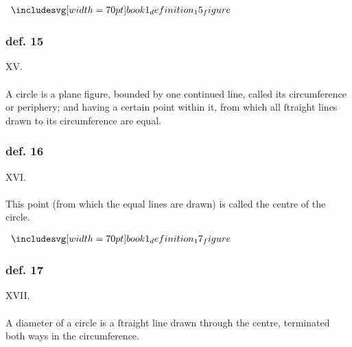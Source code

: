 \begin{minipage}{0.33\textwidth}
    \begin{center}
        $\img[0][0][70]{book1_definition_15_figure}$
    \end{center}
\end{minipage}%
\begin{minipage}{0.67\textwidth}
    \subsubsection{def. 15}
    \begin{center}
        XV.\label{book1def15}\\
        \hfill\\
        A circle is a plane figure, bounded by one continued line, called its circumference or periphery; and having a certain point within it, from which all ſtraight lines drawn to its circumference are equal.
    \end{center}
\end{minipage}

\hfill

\begin{minipage}{0.33\textwidth}
    \phantom{}
\end{minipage}%
\begin{minipage}{0.67\textwidth}
    \subsubsection{def. 16}
    \begin{center}
        XVI.\label{book1def16}\\
        \hfill\\
        This point (from which the equal lines are drawn) is called the \mbox{centre} of the circle.
    \end{center}
\end{minipage}

\hfill

\begin{minipage}{0.33\textwidth}
    \begin{center}
        $\img[0][0][70]{book1_definition_17_figure}$
    \end{center}
\end{minipage}%
\begin{minipage}{0.67\textwidth}
    \subsubsection{def. 17}
    \begin{center}
        XVII.\label{book1def17}\\
        \hfill\\
        A diameter of a circle is a ſtraight line drawn through the centre, terminated both ways in the circumference.
    \end{center}
\end{minipage}

